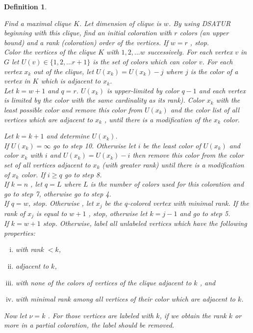 \documentclass[12pt]{article}
\theoremstyle{slplain}
\newtheorem{defi}{Definition}[section]
\begin{document}
\begin{defi}
\begin{algorithm}[H]
{\small  Find a maximal clique $K$. Let dimension of clique is $w$. By using DSATUR
beginning with this clique, find an initial coloration with $r$ colors (an
upper bound) and a rank (coloration) order of the vertices. If $w = r$ , stop.\\

 Color the vertices of the clique $K$ with $1, 2, . . . w$ successively. For each
vertex $v$ in $G$ let $U(v) \in \{1, 2, . . . r + 1\}$ is the set of colors which can color
$v$. For each vertex $x_k$ out of the clique, let $U(x_k) = U(x_k) - j$ where $j$ is
the color of a vertex in $K$ which is adjacent to $x_k$.\\

 Let $k = w + 1$ and $q = r$.\newline
$U(x_k)$ is upper-limited by color $q - 1$ and each vertex is limited by the color
with the same cardinality as its rank). Color $x_k$ with the least possible
color and remove this color from $U(x_k)$ and the color list of all vertices
which are adjacent to $x_k$ , until there is a modification of the $x_k$ color.

 Let $k = k + 1$ and determine $U(x_k)$.\\

 If $U(x_k) = \infty$ go to step 10. Otherwise let $i$ be the least color of $U(x_k)$ and
color $x_k$ with $i$ and $U(x_k) = U(x_k) - i$ then remove this color from the
color set of all vertices adjacent to $x_k$ (with greater rank) until there is a
modification of $x_k$ color. If $i \geq q$ go to step 8.\\

 If $k = n$ , let $q = L$ where $L$ is the number of colors used for this coloration
and go to step 7, otherwise go to step 4.\\

 If $q = w$, stop. Otherwise , let $x_j$ be the $q$-colored vertex with minimal
rank. If the rank of $x_j$ is equal to $w + 1$ , stop, otherwise let $k = j - 1$ and
go to step 5.\\

 If $k = w + 1$ stop. Otherwise, label all unlabeled vertices which have the
following properties:
\begin{enumerate}[(i)]
\item with rank $< k$,

\item adjacent to $k$,

\item with none of the colors of vertices of the clique adjacent to $k$ , and
\item with minimal rank among all vertices of their color which are adjacent
to $k$.
\end{enumerate}\newline
Now let $\nu = k$ . For those vertices are labeled with $k$, if we obtain the rank
$k$ or more in a partial coloration, the label should be removed.\\


}
\end{algorithm}
\end{defi}
\end{document}
